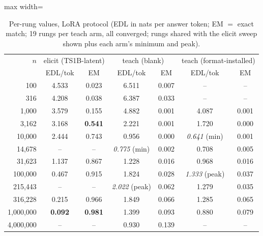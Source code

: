 \documentclass[11pt]{article}
\begin{document}
\begin{enumerate}[label=\textbf{M\arabic*}, leftmargin=*, itemsep=1.2em]
\begin{table}[h]
\begin{adjustbox}{max width=\textwidth}
\begin{tabular}{rcccccc}
\toprule
$n$ & \multicolumn{2}{c}{elicit (TS1B-latent)} & \multicolumn{2}{c}{teach (blank)} & \multicolumn{2}{c}{teach (format-installed)} \\
 & EDL/tok & EM & EDL/tok & EM & EDL/tok & EM \\
\midrule
100 & 4.533 & 0.023 & 6.511 & 0.007 & -- & -- \\
316 & 4.208 & 0.038 & 6.387 & 0.033 & -- & -- \\
1{,}000 & 3.579 & 0.155 & 4.882 & 0.001 & 4.087 & 0.001 \\
3{,}162 & 3.168 & \textbf{0.541} & 2.221 & 0.001 & 1.720 & 0.000 \\
10{,}000 & 2.444 & 0.743 & 0.956 & 0.000 & \emph{0.641} (min) & 0.001 \\
14{,}678 & -- & -- & \emph{0.775} (min) & 0.002 & 0.708 & 0.005 \\
31{,}623 & 1.137 & 0.867 & 1.228 & 0.016 & 0.968 & 0.016 \\
100{,}000 & 0.467 & 0.915 & 1.824 & 0.028 & \emph{1.333} (peak) & 0.037 \\
215{,}443 & -- & -- & \emph{2.022} (peak) & 0.062 & 1.279 & 0.035 \\
316{,}228 & 0.215 & 0.966 & 1.849 & 0.066 & 1.285 & 0.065 \\
1{,}000{,}000 & \textbf{0.092} & \textbf{0.981} & 1.399 & 0.093 & 0.880 & 0.079 \\
4{,}000{,}000 & -- & -- & 0.930 & 0.139 & -- & -- \\
\bottomrule
\end{tabular}
\end{adjustbox}
\caption{Per-rung values, LoRA protocol (EDL in nats per answer token; EM $=$ exact match; 19
rungs per teach arm, all converged; rungs shared with the elicit sweep shown plus each arm's
minimum and peak).}
\label{tab:sweep}
\end{table}

\end{enumerate}
\end{document}
